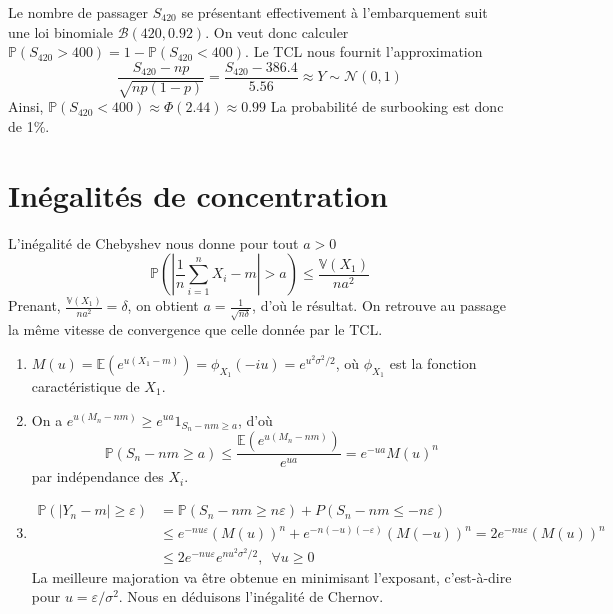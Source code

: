 \label{IV-answer-surbooking}
Le nombre de passager \(S_{420}\) se présentant effectivement à
l'embarquement suit une loi binomiale \(\mathcal{B}(420,0.92)\). On veut
donc calculer
\(\mathbb{P}(S_{420} > 400) = 1 - \mathbb{P}(S_{420}<400)\). Le TCL nous
fournit l'approximation
\[\frac{S_{420} - np}{\sqrt{n p (1-p)}} = \frac{S_{420} - 386.4}{5.56} \approx Y \sim \mathcal{N}(0,1)\]
Ainsi, \(\mathbb{P}(S_{420}<400) \approx \Phi(2.44) \approx 0.99\) La
probabilité de surbooking est donc de 1\%.

\section{Inégalités de
concentration}\label{IV-inuxe9galituxe9s-de-concentration-1}

\label{IV-answer-idc1}
L'inégalité de Chebyshev nous donne pour tout \(a>0\)
\[\mathbb{P}\left(\left|\frac{1}{n}\sum_{i=1}^n X_i - m \right| > a\right) \leq \frac{\mathbb{V}(X_1)}{n a^2}\]
Prenant, \(\frac{\mathbb{V}(X_1)}{n a^2} = \delta\), on obtient
\(a = \frac{1}{\sqrt{n\delta}}\), d'où le résultat. On retrouve au
passage la même vitesse de convergence que celle donnée par le TCL.

\label{IV-answer-idc2}

\begin{enumerate}
\def\labelenumi{\roman{enumi})}
\tightlist
\item
  \(M(u) = \mathbb{E}(e^{u(X_1 -m)}) = \phi_{X_1}(-iu) = e^{u^2 \sigma^2/2}\),
  où \(\phi_{X_1}\) est la fonction caractéristique de \(X_1\).
\item
  On a \(e^{u(M_n-nm)} \geq e^{ua} 1_{S_n -nm \geq a}\), d'où
  \[\mathbb{P}(S_n -nm \geq a) \leq \frac{\mathbb{E}(e^{u(M_n-nm)})}{e^{ua}} = e^{-ua}M(u)^n\]
  par indépendance des \(X_i\).
\item
  \begin{align*}
  \mathbb{P}(|Y_n - m| \geq \varepsilon) &= \mathbb{P}(S_n - nm \geq n\varepsilon) + P(S_n - nm \leq -n\varepsilon) \\
                         &\leq e^{-nu\varepsilon} (M (u))^n + e^{-n(-u)(-\varepsilon)} (M (-u))^n = 2e^{-nu\varepsilon}(M (u))^n \\
                         &\leq 2e^{-nu\varepsilon}e^{nu^2\sigma^2/2}, \,\,\, \forall u \geq 0
  \end{align*} La meilleure majoration va être obtenue en minimisant
  l'exposant, c'est-à-dire pour \(u = \varepsilon/\sigma^2\). Nous en
  déduisons l'inégalité de Chernov.
\end{enumerate}


